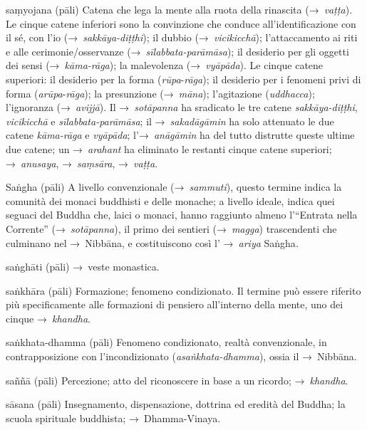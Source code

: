 \begin{glossarydescription}
\item[saṃyojana] (pāli)\label{glossary-samyojana} Catena che lega la mente alla ruota della rinascita
  (→~\emph{vaṭṭa}). Le cinque catene inferiori sono la convinzione che conduce
  all'identificazione con il sé, con l'io (→~\emph{sakkāya-diṭṭhi}); il dubbio
  (→~\emph{vicikicchā}); l'attaccamento ai riti e alle cerimonie/osservanze
  (→~\emph{sīlabbata-parāmāsa}); il desiderio per gli oggetti dei sensi
  (→~\emph{kāma-rāga}); la malevolenza (→~\emph{vyāpāda}). Le cinque catene
  superiori: il desiderio per la forma (\emph{rūpa}-\emph{rāga}); il desiderio
  per i fenomeni privi di forma (\emph{arūpa}-\emph{rāga}); la presunzione
  (→~\emph{māna}); l'agitazione (\emph{uddhacca}); l'ignoranza
  (→~\emph{avijjā}). Il →~\emph{sotāpanna} ha sradicato le tre catene
  \emph{sakkāya-diṭṭhi}, \emph{vicikicchā} e \emph{sīlabbata-parāmāsa}; il
  →~\emph{sakadāgāmin} ha solo attenuato le due catene \emph{kāma-rāga} e
  \emph{vyāpāda}; l'→~\emph{anāgāmin} ha del tutto distrutte queste ultime due
  catene; un →~\emph{arahant} ha eliminato le restanti cinque catene superiori;
  →~\emph{anusaya}, →~\emph{saṃsāra}, →~\emph{vaṭṭa}.

\item[Saṅgha] (pāli) A livello convenzionale (→~\emph{sammuti}), questo termine
  indica la comunità dei monaci buddhisti e delle monache; a livello ideale,
  indica quei seguaci del Buddha che, laici o monaci, hanno raggiunto almeno
  l'``Entrata nella Corrente'' (→~\emph{sotāpanna}), il primo dei sentieri
  (→~\emph{magga}) trascendenti che culminano nel →~Nibbāna, e
  costituiscono così l' →~\emph{ariya} Saṅgha\emph{.}

\item[saṅghāti] (pāli) →~veste monastica.

\item[saṅkhāra] (pāli) Formazione; fenomeno condizionato. Il termine può essere
  riferito più specificamente alle formazioni di pensiero all'interno della
  mente, uno dei cinque →~\emph{khandha}.

\item[saṅkhata-dhamma] (pāli) Fenomeno condizionato, realtà convenzionale, in
  contrapposizione con l'incondizionato (\emph{asaṅkhata-dhamma}), ossia il
  →~Nibbāna.

\item[saññā] (pāli) Percezione; atto del riconoscere in base a un ricordo;
  →~\emph{khandha}.

\item[sāsana] (pāli) Insegnamento, dispensazione, dottrina ed eredità del
  Buddha; la scuola spirituale buddhista; →~Dhamma-Vinaya.


\end{glossarydescription}
